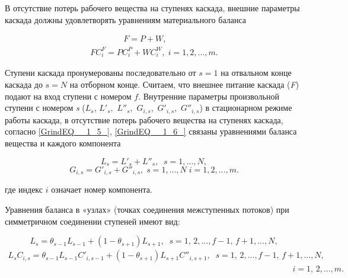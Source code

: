 В отсутствие потерь рабочего вещества на ступенях каскада, внешние параметры каскада должны удовлетворять уравнениям материального баланса

\begin{equation} \label{GrindEQ__1_21_} 
  \begin{array}{l} {\quad \quad \quad \quad F=P+W,} \\ {FC_{i}^{F} =PC_{i}^{P} +WC_{i}^{W} ,\; i=1,2,...,m.} \end{array} 
\end{equation} 

Ступени каскада пронумерованы последовательно от $s=1$ на отвальном конце каскада до $s=N$ на отборном конце. Считаем, что внешнее питание каскада (\textit{F}) подают на вход ступени с номером $f$. Внутренние параметры произвольной ступени с номером \textit{s} ($L_{s} $, $L'_{s} ,$ $L''_{s} ,$ $G_{i,s} ,$ $G'_{i,s} ,$ $G''_{i,s} $) в стационарном режиме работы каскада, в отсутствие потерь рабочего вещества на ступенях каскада, согласно  \ref{GrindEQ__1_5_},  \ref{GrindEQ__1_6_} связаны уравнениями баланса вещества и каждого компонента

\begin{equation} \label{GrindEQ__1_22_} 
  L_{s} =L'_{s} +L''_{s} ,\; \; s=1,...,N,            
  \end{equation} 
  \begin{equation} \label{GrindEQ__1_23_} 
  G_{i,s} =G'_{i,s} +G''_{i,s} ,\;s=1,...,N \; i=1,2,...,m.           
  \end{equation} 

где индекс $i$ означает номер компонента.

Уравнения баланса в «узлах» (точках соединения межступенных потоков) при симметричном соединении ступеней имеют вид:

\begin{equation} \label{GrindEQ__1_24_} 
  L_{s} =\theta _{s-1} L_{s-1} +(1-\theta _{s+1} )L_{s+1} ,\; \; s=1,\, 2,...,f-1,\, f+1,...,N, 
  \end{equation} 
  \begin{equation} \label{GrindEQ__1_25_} 
  \begin{array}{l} {L_{s} C_{i,s} =\theta _{s-1} L_{s-1} C'_{i,s-1} +(1-\theta _{s+1} )L_{s+1} C''_{i,s+1} ,\; \; s=1,\, 2,...,f-1,\, f+1,...,N,} \\ {\; \; \; \; \; \; \; \; \; \; \; \; \; \; \; \; \; \; \; \; \; \; \; \; \; \; \; \; \; \; \; \; \; \quad \quad \quad \quad \quad \; \; \; \; \; \; \; \; \; \; \; \; \; \quad \quad \quad \; \; \; \; \; \; \; \; \; \; \; \; \; \quad \quad \quad \; \; \; \; \; \; \; \; \; \; \; \; \; \quad \quad \; \quad i=1,\, 2,...,m.} \end{array} 
  \end{equation} 

